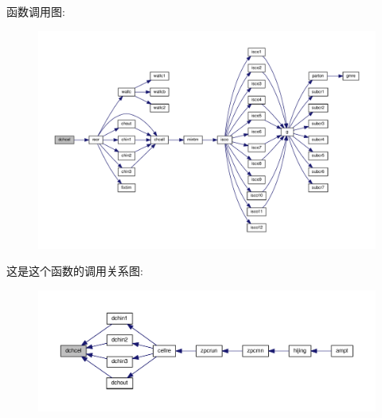 函数调用图\+:
\nopagebreak
\begin{figure}[H]
\begin{center}
\leavevmode
\includegraphics[width=350pt]{dchcel_8f90_a8b4c3c2a6b5f6732c2092fd53718f88f_cgraph}
\end{center}
\end{figure}
这是这个函数的调用关系图\+:
\nopagebreak
\begin{figure}[H]
\begin{center}
\leavevmode
\includegraphics[width=350pt]{dchcel_8f90_a8b4c3c2a6b5f6732c2092fd53718f88f_icgraph}
\end{center}
\end{figure}
